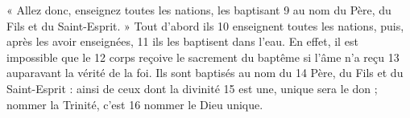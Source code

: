 « Allez donc, enseignez toutes les nations, les baptisant	 
9	 	au nom du Père, du Fils et du Saint-Esprit. » Tout d'abord ils	 
10	 	enseignent toutes les nations, puis, après les avoir enseignées,	 
11	 	ils les baptisent dans l'eau. En effet, il est impossible que le	 
12	 	corps reçoive le sacrement du baptême si l'âme n'a reçu	 
13	 	auparavant la vérité de la foi. Ils sont baptisés au nom du	 
14	 	Père, du Fils et du Saint-Esprit : ainsi de ceux dont la divinité	 
15	 	est une, unique sera le don ; nommer la Trinité, c'est	 
16	 	nommer le Dieu unique.